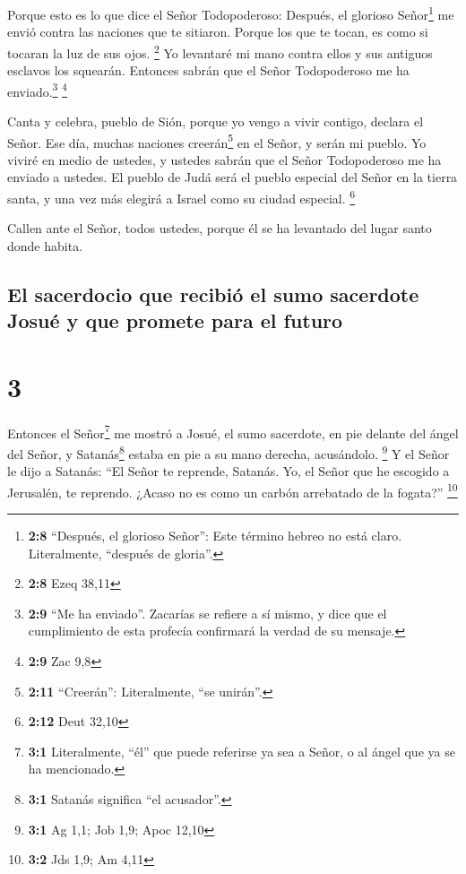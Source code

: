  Porque esto es lo que dice el Señor Todopoderoso:
Después, el glorioso Señor\footnote{\textbf{2:8} ``Después, el glorioso
  Señor'': Este término hebreo no está claro. Literalmente, ``después de
  gloria''.} me envió contra las naciones que te sitiaron. Porque los
que te tocan, es como si tocaran la luz de sus ojos. \footnote{\textbf{2:8}
  Ezeq 38,11}  Yo levantaré mi mano contra ellos y sus
antiguos esclavos los squearán. Entonces sabrán que el Señor
Todopoderoso me ha enviado.\footnote{\textbf{2:9} ``Me ha enviado''.
  Zacarías se refiere a sí mismo, y dice que el cumplimiento de esta
  profecía confirmará la verdad de su mensaje.} \footnote{\textbf{2:9}
  Zac 9,8}

 Canta y celebra, pueblo de Sión, porque yo vengo a vivir
contigo, declara el Señor.  Ese día, muchas naciones
creerán\footnote{\textbf{2:11} ``Creerán'': Literalmente, ``se unirán''.}
en el Señor, y serán mi pueblo. Yo viviré en medio de ustedes, y ustedes
sabrán que el Señor Todopoderoso me ha enviado a ustedes.
 El pueblo de Judá será el pueblo especial del Señor en
la tierra santa, y una vez más elegirá a Israel como su ciudad especial.
\footnote{\textbf{2:12} Deut 32,10}

 Callen ante el Señor, todos ustedes, porque él se ha
levantado del lugar santo donde habita.

\hypertarget{el-sacerdocio-que-recibiuxf3-el-sumo-sacerdote-josuuxe9-y-que-promete-para-el-futuro}{%
\subsection{El sacerdocio que recibió el sumo sacerdote Josué y que
promete para el
futuro}\label{el-sacerdocio-que-recibiuxf3-el-sumo-sacerdote-josuuxe9-y-que-promete-para-el-futuro}}

\hypertarget{section-2}{%
\section{3}\label{section-2}}

 Entonces el Señor\footnote{\textbf{3:1} Literalmente,
  ``él'' que puede referirse ya sea a Señor, o al ángel que ya se ha
  mencionado.} me mostró a Josué, el sumo sacerdote, en pie delante del
ángel del Señor, y Satanás\footnote{\textbf{3:1} Satanás significa ``el
  acusador''.} estaba en pie a su mano derecha, acusándolo. \footnote{\textbf{3:1}
  Ag 1,1; Job 1,9; Apoc 12,10}  Y el Señor le dijo a
Satanás: ``El Señor te reprende, Satanás. Yo, el Señor que he escogido a
Jerusalén, te reprendo. ¿Acaso no es como un carbón arrebatado de la
fogata?'' \footnote{\textbf{3:2} Jds 1,9; Am 4,11}

